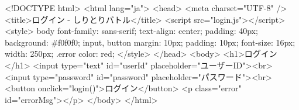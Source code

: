 <!DOCTYPE html>
<html lang="ja">
<head>
  <meta charset="UTF-8" />
  <title>ログイン - しりとりバトル</title>
  <script src="login.js"></script>
  <style>
    body {
      font-family: sans-serif;
      text-align: center;
      padding: 40px;
      background: #f0f0f0;
    }
    input, button {
      margin: 10px;
      padding: 10px;
      font-size: 16px;
      width: 250px;
    }
    .error { color: red; }
  </style>
</head>
<body>
  <h1>ログイン</h1>
  <input type="text" id="userId" placeholder="ユーザーID"><br>
  <input type="password" id="password" placeholder="パスワード"><br>
  <button onclick="login()">ログイン</button>
  <p class="error" id="errorMsg"></p>
</body>
</html>
